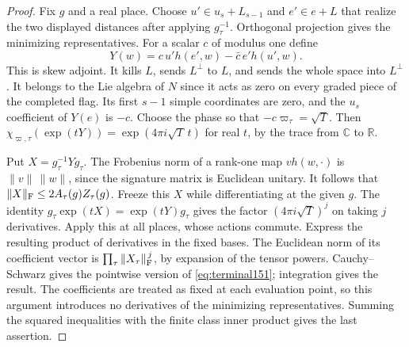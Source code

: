 \documentclass[a4paper,11pt]{article}
\theoremstyle{definition}
\theoremstyle{remark}
\newcommand{\RR}{\mathbb R}\newcommand{\CC}{\mathbb C}\newcommand{\QQ}{\mathbb Q}
\numberwithin{equation}{section}
\begin{document}
\begin{proof}
Fix \(g\) and a real place. Choose \(u'\in u_s+L_{s-1}\)
and \(e'\in e+L\) that realize the two displayed distances
after applying \(g_\tau^{-1}\). Orthogonal projection gives
the minimizing representatives. For a scalar \(c\) of modulus
one define
\[
       Y(w)=c\,u' h(e',w)-\bar c\,e'h(u',w).
\]
This is skew adjoint. It kills \(L\), sends \(L^\perp\) to
\(L\), and sends the whole space into \(L^\perp\).
It belongs to the Lie algebra of \(N\) since it acts as zero
on every graded piece of the completed flag. Its first
\(s-1\) simple coordinates are zero, and the \(u_s\)
coefficient of \(Y(e)\) is \(-c\). Choose the phase so that
\(-c\varpi_\tau=\sqrt T\). Then
\(\chi_{\varpi,\tau}(\exp(tY))=\exp(4\pi i\sqrt T\,t)\)
for real \(t\), by the trace from \(\CC\) to \(\RR\).

Put \(X=g_\tau^{-1}Yg_\tau\). The Frobenius norm of a
rank-one map \(v h(w,\cdot)\) is \(\|v\|\,\|w\|\), since the
signature matrix is Euclidean unitary. It follows that
\(\|X\|_{\rm F}\le 2A_\tau(g)Z_\tau(g)\).
Freeze this \(X\) while differentiating at the given \(g\).
The identity \(g_\tau\exp(tX)=\exp(tY)g_\tau\) gives the
factor \((4\pi i\sqrt T)^j\) on taking \(j\) derivatives.
Apply this at all places, whose actions commute. Express the
resulting product of derivatives in the fixed bases. The
Euclidean norm of its coefficient vector is
\(\prod_\tau\|X_\tau\|_{\rm F}^{\,j}\), by expansion of the
tensor powers. Cauchy--Schwarz gives the pointwise version
of \eqref{eq:terminal151}; integration gives the result.
The coefficients are treated as fixed at each evaluation
point, so this argument introduces no derivatives of the
minimizing representatives. Summing the squared inequalities
with the finite class inner product gives the last assertion.
\end{proof}
\end{document}
